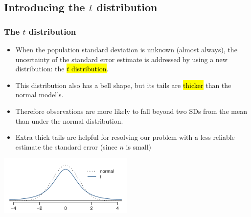 
\subsection{Introducing the $t$ distribution}


\begin{frame}
\frametitle{The $t$ distribution}

\begin{itemize}

\item When the population standard deviation is unknown (almost always), the uncertainty of the standard error estimate is addressed by using a new distribution: the \hl{$t$ distribution}.

\pause

\item This distribution also has a bell shape, but its tails are \hl{thicker} than the normal model's.

\pause

\item Therefore observations are more likely to fall beyond two SDs from the mean than under the normal distribution.

\pause

\item Extra thick tails are helpful for resolving our problem with a less reliable estimate the standard error (since $n$ is small)

\end{itemize}

\begin{center}
\includegraphics[width=0.5\textwidth]{7-1_one_t/figures/tDistCompareToNormalDist/tDistCompareToNormalDist}
\end{center}

\end{frame}


